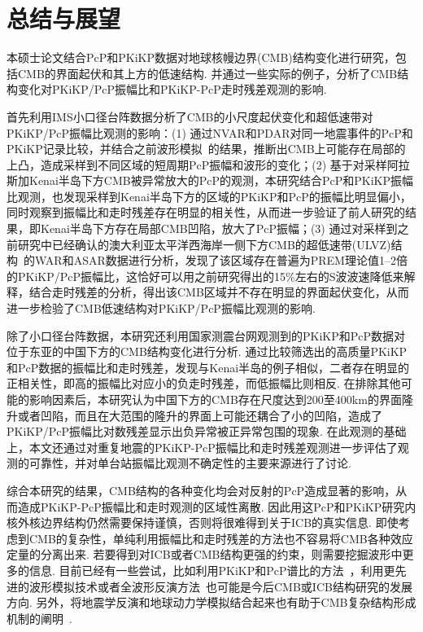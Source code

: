\chapter{总结与展望}

本硕士论文结合PcP和PKiKP数据对地球核幔边界(CMB)结构变化进行研究，包括CMB的界面起伏和其上方的低速结构. 并通过一些实际的例子，分析了CMB结构变化对PKiKP/PcP振幅比和PKiKP-PcP走时残差观测的影响. 

首先利用IMS小口径台阵数据分析了CMB的小尺度起伏变化和超低速带对PKiKP/PcP振幅比观测的影响：(1) 通过NVAR和PDAR对同一地震事件的PcP和PKiKP记录比较，并结合之前波形模拟~\citep{Wu2014a}的结果，推断出CMB上可能存在局部的上凸，造成采样到不同区域的短周期PcP振幅和波形的变化；(2) 基于\citet{Rost2004a}对采样阿拉斯加Kenai半岛下方CMB被异常放大的PcP的观测，本研究结合PcP和PKiKP振幅比观测，也发现采样到Kenai半岛下方的区域的PKiKP和PcP的振幅比明显偏小，同时观察到振幅比和走时残差存在明显的相关性，从而进一步验证了前人研究的结果，即Kenai半岛下方存在局部CMB凹陷，放大了PcP振幅；(3) 通过对采样到之前研究中已经确认的澳大利亚太平洋西海岸一侧下方CMB的超低速带(ULVZ)结构~\citep{He2006a,He2012a,Thorne2004a}的WAR和ASAR数据进行分析，发现了该区域存在普遍为PREM理论值1--2倍的PKiKP/PcP振幅比，这恰好可以用之前研究得出的15\%左右的S波波速降低来解释，结合走时残差的分析，得出该CMB区域并不存在明显的界面起伏变化，从而进一步检验了CMB低速结构对PKiKP/PcP振幅比观测的影响. 

除了小口径台阵数据，本研究还利用国家测震台网观测到的PKiKP和PcP数据对位于东亚的中国下方的CMB结构变化进行分析. 通过比较筛选出的高质量PKiKP和PcP数据的振幅比和走时残差，发现与Kenai半岛的例子相似，二者存在明显的正相关性，即高的振幅比对应小的负走时残差，而低振幅比则相反. 在排除其他可能的影响因素后，本研究认为中国下方的CMB存在尺度达到200至400km的界面隆升或者凹陷，而且在大范围的隆升的界面上可能还耦合了小的凹陷，造成了PKiKP/PcP振幅比对数残差显示出负异常被正异常包围的现象. 在此观测的基础上，本文还通过对重复地震的PKiKP-PcP振幅比和走时残差观测进一步评估了观测的可靠性，并对单台站振幅比观测不确定性的主要来源进行了讨论. 

综合本研究的结果，CMB结构的各种变化均会对反射的PcP造成显著的影响，从而造成PKiKP-PcP振幅比和走时观测的区域性离散. 因此用这PcP和PKiKP研究内核外核边界结构仍然需要保持谨慎，否则将很难得到关于ICB的真实信息. 即使考虑到CMB的复杂性，单纯利用振幅比和走时残差的方法也不容易将CMB各种效应定量的分离出来. 若要得到对ICB或者CMB结构更强的约束，则需要挖掘波形中更多的信息. 目前已经有一些尝试，比如利用PKiKP和PcP谱比的方法~\citep{Tanaka2015a}，利用更先进的波形模拟技术或者全波形反演方法~\citep{Fichtner2009}也可能是今后CMB或ICB结构研究的发展方向. 另外，将地震学反演和地球动力学模拟结合起来也有助于CMB复杂结构形成机制的阐明~\citep{Steinberger2008a,Soldati2012a}.